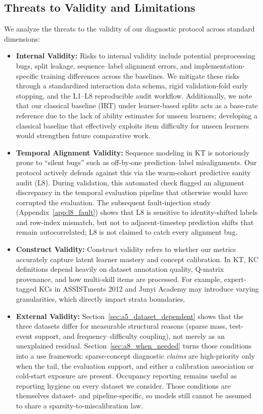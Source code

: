 \subsection{Threats to Validity and Limitations}
\label{sec:threats}
We analyze the threats to the validity of our diagnostic protocol across standard dimensions:
\begin{itemize}
    \item \textbf{Internal Validity:} Risks to internal validity include potential preprocessing bugs, split leakage, sequence--label alignment errors, and implementation-specific training differences across the baselines. We mitigate these risks through a standardized interaction data schema, rigid validation-fold early stopping, and the L1--L8 reproducible audit workflow. Additionally, we note that our classical baseline (IRT) under learner-based splits acts as a base-rate reference due to the lack of ability estimates for unseen learners; developing a classical baseline that effectively exploits item difficulty for unseen learners would strengthen future comparative work.
    \item \textbf{Temporal Alignment Validity:} Sequence modeling in KT is notoriously prone to ``silent bugs'' such as off-by-one prediction--label misalignments. Our protocol actively defends against this via the warm-cohort predictive sanity audit (L8). During validation, this automated check flagged an alignment discrepancy in the temporal evaluation pipeline that otherwise would have corrupted the evaluation. The subsequent fault-injection study (Appendix~\ref{app:l8_fault}) shows that L8 is sensitive to identity-shifted labels and row-index mismatch, but not to adjacent-timestep prediction shifts that remain autocorrelated; L8 is not claimed to catch every alignment bug.
    \item \textbf{Construct Validity:} Construct validity refers to whether our metrics accurately capture latent learner mastery and concept calibration. In KT, KC definitions depend heavily on dataset annotation quality, Q-matrix provenance, and how multi-skill items are processed. For example, expert-tagged KCs in ASSISTments 2012 and Junyi Academy may introduce varying granularities, which directly impact strata boundaries.
    \item \textbf{External Validity:} Section~\ref{sec:a5_dataset_dependent} shows that the three datasets differ for measurable structural reasons (sparse mass, test-event support, and frequency--difficulty coupling), not merely as an unexplained residual. Section~\ref{sec:a8_when_needed} turns those conditions into a use framework: sparse-concept diagnostic \emph{claims} are high-priority only when the tail, the evaluation support, and either a calibration association or cold-start exposure are present. Occupancy reporting remains useful as reporting hygiene on every dataset we consider. Those conditions are themselves dataset- and pipeline-specific, so models still cannot be assumed to share a sparsity-to-miscalibration law.

\end{itemize}
